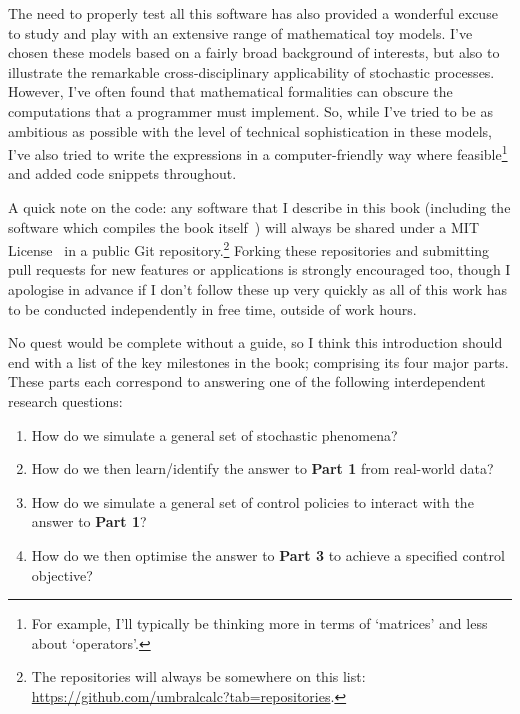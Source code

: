 \documentclass{book}
\begin{document}
The need to properly test all this software has also provided a wonderful excuse to study and play with an extensive range of mathematical toy models. I've chosen these models based on a fairly broad background of interests, but also to illustrate the remarkable cross-disciplinary applicability of stochastic processes. However, I've often found that mathematical formalities can obscure the computations that a programmer must implement. So, while I've tried to be as ambitious as possible with the level of technical sophistication in these models, I've also tried to write the expressions in a computer-friendly way where feasible\footnote{For example, I'll typically be thinking more in terms of `matrices' and less about `operators'.} and added code snippets throughout.

A quick note on the code: any software that I describe in this book (including the software which compiles the book itself~\cite{diffusingideasbookgithub}) will always be shared under a MIT License~\cite{mitlicense} in a public Git repository.\footnote{The repositories will always be somewhere on this list: \href{https://github.com/umbralcalc?tab=repositories}{https://github.com/umbralcalc?tab=repositories}.} Forking these repositories and submitting pull requests for new features or applications is strongly encouraged too, though I apologise in advance if I don't follow these up very quickly as all of this work has to be conducted independently in free time, outside of work hours.

No quest would be complete without a guide, so I think this introduction should end with a list of the key milestones in the book; comprising its four major parts. These parts each correspond to answering one of the following interdependent research questions:

\begin{enumerate}[leftmargin=2.5\parindent] 
\item[{\bfseries\sffamily Part 1.}]{How do we simulate a general set of stochastic phenomena?}
\item[{\bfseries\sffamily Part 2.}]{How do we then learn/identify the answer to {\bfseries\sffamily Part 1} from real-world data?}
\item[{\bfseries\sffamily Part 3.}]{How do we simulate a general set of control policies to interact with the answer to {\bfseries\sffamily Part 1}?}
\item[{\bfseries\sffamily Part 4.}]{How do we then optimise the answer to {\bfseries\sffamily Part 3} to achieve a specified control objective?} 
\end{enumerate}
\end{document}
